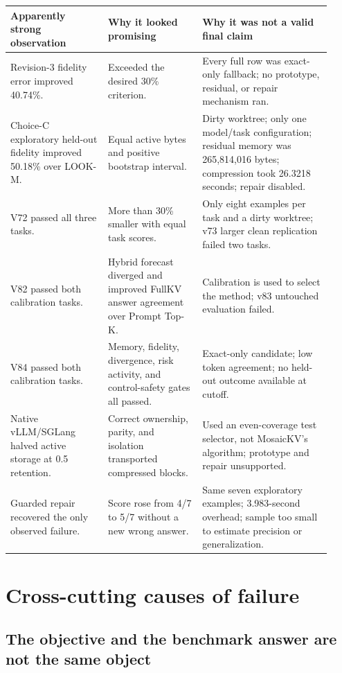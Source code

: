\documentclass[11pt]{article}
\begin{document}
\begin{longtable}{p{0.28\linewidth}p{0.27\linewidth}p{0.37\linewidth}}
\toprule
Apparently strong observation & Why it looked promising & Why it was not a valid final claim \\
\midrule
Revision-3 fidelity error improved 40.74\%. & Exceeded the desired 30\% criterion. & Every full row
was exact-only fallback; no prototype, residual, or repair mechanism ran. \\
Choice-C exploratory held-out fidelity improved 50.18\% over LOOK-M. & Equal active bytes and
positive bootstrap interval. & Dirty worktree; only one model/task configuration; residual memory
was 265,814,016 bytes; compression took 26.3218 seconds; repair disabled. \\
V72 passed all three tasks. & More than 30\% smaller with equal task scores. & Only eight examples
per task and a dirty worktree; v73 larger clean replication failed two tasks. \\
V82 passed both calibration tasks. & Hybrid forecast diverged and improved FullKV answer agreement
over Prompt Top-K. & Calibration is used to select the method; v83 untouched evaluation failed. \\
V84 passed both calibration tasks. & Memory, fidelity, divergence, risk activity, and control-safety
gates all passed. & Exact-only candidate; low token agreement; no held-out outcome available at
cutoff. \\
Native vLLM/SGLang halved active storage at 0.5 retention. & Correct ownership, parity, and isolation
transported compressed blocks. & Used an even-coverage test selector, not MosaicKV's algorithm;
prototype and repair unsupported. \\
Guarded repair recovered the only observed failure. & Score rose from 4/7 to 5/7 without a new wrong
answer. & Same seven exploratory examples; 3.983-second overhead; sample too small to estimate
precision or generalization. \\
\bottomrule
\end{longtable}

\section{Cross-cutting causes of failure}

\subsection{The objective and the benchmark answer are not the same object}
\end{document}
